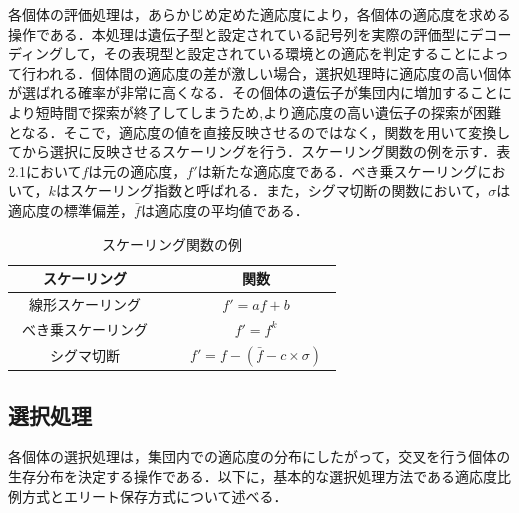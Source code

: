各個体の評価処理は，あらかじめ定めた適応度により，各個体の適応度を求める操作である．本処理は遺伝子型と設定されている記号列を実際の評価型にデコーディングして，その表現型と設定されている環境との適応を判定することによって行われる．個体間の適応度の差が激しい場合，選択処理時に適応度の高い個体が選ばれる確率が非常に高くなる．その個体の遺伝子が集団内に増加することにより短時間で探索が終了してしまうため,より適応度の高い遺伝子の探索が困難となる．そこで，適応度の値を直接反映させるのではなく，関数を用いて変換してから選択に反映させるスケーリングを行う．スケーリング関数の例を示す．表2.1において$f$は元の適応度，$f'$は新たな適応度である．べき乗スケーリングにおいて，$k$はスケーリング指数と呼ばれる．また，シグマ切断の関数において，$\sigma$は適応度の標準偏差，$\bar{f}$は適応度の平均値である．



\begin{table}[!ht]
\caption{スケーリング関数の例}
\label{tb:sk}
\begin{center}
\begin{tabular}{|c||c|}\hline
スケーリング　&　関数　\\ \hline
線形スケーリング　&　$f'=af+b$　\\ \hline
べき乗スケーリング　&　$f'=f^{k}$　\\ \hline
シグマ切断　&　$f'=f-( \bar{f} - c \times \sigma )$　\\ \hline
\end{tabular}
\end{center}
\end{table}

\newpage


\subsection{選択処理}
\label{sec2.1.3}

各個体の選択処理は，集団内での適応度の分布にしたがって，交叉を行う個体の生存分布を決定する操作である．以下に，基本的な選択処理方法である適応度比例方式とエリート保存方式について述べる．

